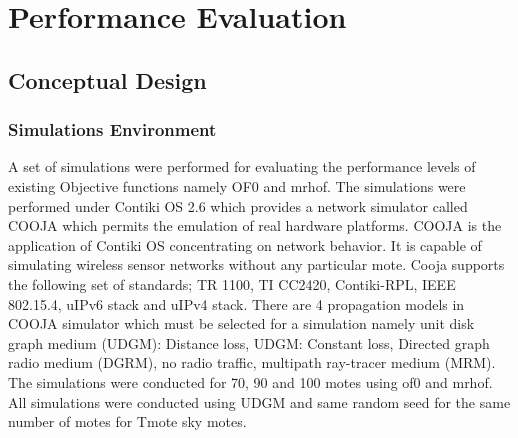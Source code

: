 \chapter{Performance Evaluation} \label{Performance Evaluation}
\section{Conceptual Design} \label{Conceptual Design}
\subsection{Simulations Environment} \label{Simulations Environment}
A set of simulations were performed for evaluating the performance levels of existing Objective functions namely OF0 and mrhof. The simulations were performed under Contiki OS 2.6 which provides a network simulator called COOJA which permits the emulation of real hardware platforms. COOJA is the application of Contiki OS concentrating on network behavior. It is capable of simulating wireless sensor networks without any particular mote. Cooja supports the following set of standards; TR 1100, TI CC2420, Contiki-RPL, IEEE 802.15.4, uIPv6 stack and uIPv4 stack.\cite{3} There are 4 propagation models in COOJA simulator which must be selected for a simulation namely unit disk graph medium (UDGM): Distance loss, UDGM: Constant loss, Directed graph radio medium (DGRM), no radio traffic, multipath ray-tracer medium (MRM).\\
The simulations were conducted for 70, 90 and 100 motes using of0 and mrhof. All simulations were conducted using UDGM and same random seed for the same number of motes for Tmote sky motes.
